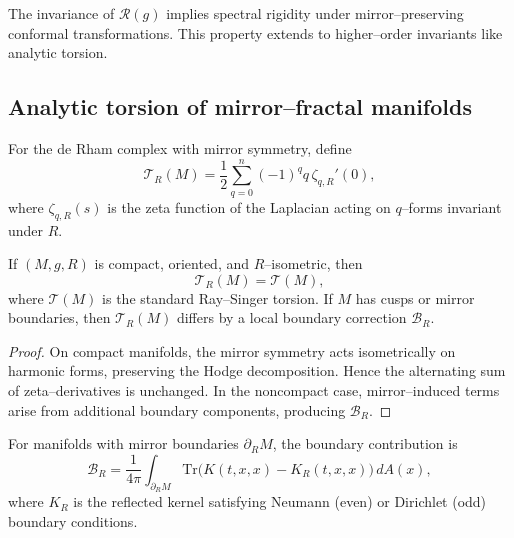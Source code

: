 \begin{remark}
\label{rem:spectral-rigidity}
The invariance of $\mathcal{R}(g)$ implies spectral rigidity under mirror–preserving conformal transformations.  
This property extends to higher–order invariants like analytic torsion. %
\end{remark}

\subsection{Analytic torsion of mirror–fractal manifolds}
\label{subsec:ch6-part6-analytic-torsion} \relax

\begin{definition}
\label{def:analytic-torsion}
For the de Rham complex with mirror symmetry, define
\[
\mathcal{T}_R(M)
=\frac{1}{2}\sum_{q=0}^n (-1)^q q\,\zeta_{q,R}'(0),
\]
where $\zeta_{q,R}(s)$ is the zeta function of the Laplacian acting on $q$–forms invariant under $R$. %
\end{definition}

\begin{theorem}
\label{thm:ray-singer}
If $(M,g,R)$ is compact, oriented, and $R$–isometric, then
\[
\mathcal{T}_R(M)=\mathcal{T}(M),
\]
where $\mathcal{T}(M)$ is the standard Ray–Singer torsion.  
If $M$ has cusps or mirror boundaries, then $\mathcal{T}_R(M)$ differs by a local boundary correction $\mathcal{B}_R$. %
\end{theorem}

\begin{proof}
On compact manifolds, the mirror symmetry acts isometrically on harmonic forms, preserving the Hodge decomposition.  
Hence the alternating sum of zeta–derivatives is unchanged.  
In the noncompact case, mirror–induced terms arise from additional boundary components, producing $\mathcal{B}_R$. %
\end{proof}

\begin{lemma}
\label{lem:boundary-correction}
For manifolds with mirror boundaries $\partial_R M$, the boundary contribution is
\[
\mathcal{B}_R
=\frac{1}{4\pi}\int_{\partial_R M} \mathrm{Tr}\big(K(t,x,x)-K_R(t,x,x)\big)\,dA(x),
\]
where $K_R$ is the reflected kernel satisfying Neumann (even) or Dirichlet (odd) boundary conditions. %
\end{lemma}

